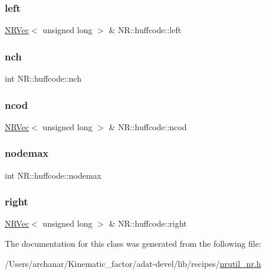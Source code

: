 \mbox{\label{classNR_1_1huffcode_ad2aaf6e4e3d2b91875ced865d3c1662e}} 
\subsubsection{\texorpdfstring{left}{left}}
{\footnotesize\ttfamily \mbox{\hyperlink{classNR_1_1NRVec}{N\+R\+Vec}}$<$ unsigned long $>$ \& N\+R\+::huffcode\+::left}

\mbox{\label{classNR_1_1huffcode_a9083384cfcc723a3ab528d4530378d56}} 
\subsubsection{\texorpdfstring{nch}{nch}}
{\footnotesize\ttfamily int N\+R\+::huffcode\+::nch}

\mbox{\label{classNR_1_1huffcode_ab14fb00caae8be1a44a6d6605f18a02d}} 
\subsubsection{\texorpdfstring{ncod}{ncod}}
{\footnotesize\ttfamily \mbox{\hyperlink{classNR_1_1NRVec}{N\+R\+Vec}}$<$ unsigned long $>$ \& N\+R\+::huffcode\+::ncod}

\mbox{\label{classNR_1_1huffcode_aef596001bc067014b5c9dc4273f33252}} 
\subsubsection{\texorpdfstring{nodemax}{nodemax}}
{\footnotesize\ttfamily int N\+R\+::huffcode\+::nodemax}

\mbox{\label{classNR_1_1huffcode_ac4dba36044a7dc9a52678f850fbc2a8c}} 
\subsubsection{\texorpdfstring{right}{right}}
{\footnotesize\ttfamily \mbox{\hyperlink{classNR_1_1NRVec}{N\+R\+Vec}}$<$ unsigned long $>$ \& N\+R\+::huffcode\+::right}



The documentation for this class was generated from the following file\+:\begin{DoxyCompactItemize}
\item 
/\+Users/archanar/\+Kinematic\+\_\+factor/adat-\/devel/lib/recipes/\mbox{\hyperlink{adat-devel_2lib_2recipes_2nrutil__nr_8h}{nrutil\+\_\+nr.\+h}}\end{DoxyCompactItemize}
